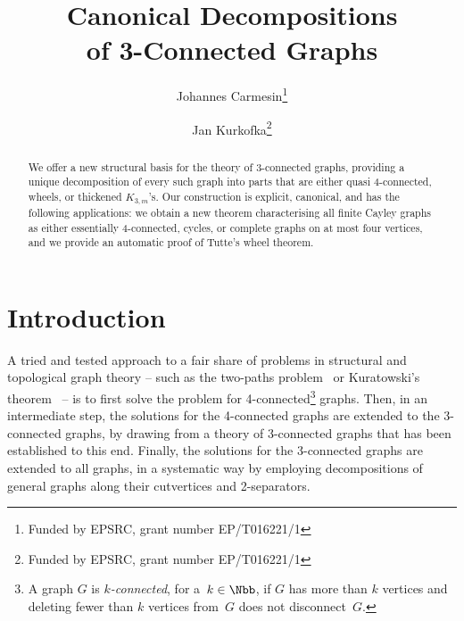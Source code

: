 \documentclass{aic}
\theoremstyle{plain}
\theoremstyle{definition}
\theoremstyle{plain}
\theoremstyle{plain}
\begin{document}
\begin{frontmatter}[classification=text]

\title{Canonical Decompositions\\of 3-Connected Graphs} %

\author[jc]{Johannes Carmesin\thanks{Funded by EPSRC, grant number EP/T016221/1}}
\author[jk]{Jan Kurkofka\thanks{Funded by EPSRC, grant number EP/T016221/1}}

\begin{abstract}
We offer a new structural basis for the theory of 3-connected
graphs, providing a unique decomposition of every such graph into
parts that are either quasi 4-connected, wheels, or
thickened $K_{3,m}$'s. Our construction is explicit,
canonical, and has the following applications:  we obtain a new theorem characterising all finite Cayley graphs
as either essentially 4-connected, cycles, or complete graphs on at
most four vertices, and we provide an automatic proof of Tutte's wheel theorem.
\end{abstract}
\end{frontmatter}

\clearpage
\tableofcontents
\newpage

\newcommand{\thechapter}{0}

\section*{Introduction}

A tried and tested approach to a fair share of problems in structural and topological graph theory -- such as the two-paths problem~\cite{GMIX,GMXIII,GMXVI} or Kuratowski's theorem~\cite{ThomassenKura} -- is to first solve the problem for 4-connected\footnote{A graph $G$ is \emph{$k$-connected}, for a~$k\in\Nbb$, if $G$ has more than $k$ vertices and deleting fewer than $k$ vertices from~$G$ does not disconnect~$G$.} graphs.
Then, in an intermediate step, the solutions for the 4-connected graphs are extended to the 3-connected graphs, by drawing from a theory of 3-connected graphs that has been established to this end.
Finally, the solutions for the 3-connected graphs are extended to all graphs, in a systematic way by employing decompositions of general graphs along their cutvertices and 2-separators.
\end{document}
